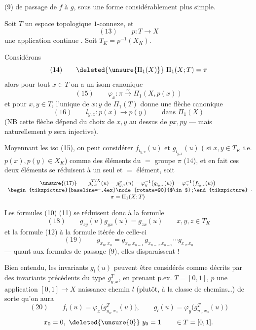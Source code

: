(9) de passage de $f$ à $g$, sous une forme considérablement plus simple.

Soit $T$ un espace topologique  $1$-connexe, et
\[
(13)\qquad p:T\longrightarrow X
\]
une application continue . Soit $T_K=p^{-1}(X_K)$.

Considérons 
\[
(14)\qquad\deleted{\unsure{\Pi_1(X)}}\ \Pi_1(X;T)=\pi
\]
alors pour tout $x\in T$ on a un isom canonique
\[
(15)\qquad\varphi_x:\pi\xrightarrow{\sim}\Pi_1(X,p(x))
\]
et pour $x,y\in T$, l'unique   de  $x:y$ de $\Pi_1(T)$ donne  une flèche canonique
\[
(16)\qquad l_{y,x}:p(x)\longrightarrow p(y)\qquad\text{dans }\Pi_1(X)
\]
(NB cette flèche dépend du choix de $x,y$ au dessus de $px,py$ --- mais naturellement $p$ sera injective).

Moyennant les iso (15), on peut considérer $f_{l_{y,x}}(u)$ et $g_{l_{y,x}}(u)$ ( si $x,y\in T_K$ i.e. $p(x),p(y)\in X_K$) comme des éléments du $=$ groupe $\pi$ (14),  et en fait ces deux éléments se réduisent à un seul et $=$ élément, soit
\[
\begin{array}{c}
\unsure{(17)}\qquad g_{y,x}^{T/X}(u)=g_{y,x}^{p}(u)=\varphi_y^{-1}\bigl(g_{l_{y,x}}(u)\bigr)=\varphi_x^{-1}\bigl(f_{l_{y,x}}(u)\bigr)\\
\begin{tikzpicture}[baseline=-.4ex]\node[rotate=90]{$\in$};\end{tikzpicture}\\
\pi=\Pi_1(X;T)
\end{array}.
\]

Les formules (10) (11) se réduisent donc à la formule
\[
(18)\qquad g_{zy}(u)g_{yx}(u)=g_{zx}(u)\qquad x,y,z\in T_K
\]
et la formule (12) à la formule itérée de celle-ci
\[
(19)\qquad g_{x_n,x_0}=g_{x_n,x_{n-1}}\,g_{x_{n-1},x_{n-2}}\cdots g_{x_1,x_0}
\]
--- quant aux formules de passage (9), elles  disparaissent !

Bien entendu, les invariants $g_l(u)$  peuvent être considérés comme décrits par des invariants précédents du type $g_{y,x}^T$, en prenant  p.ex. $T=[0,1]$, $p$ une application $[0,1]\longrightarrow X$  naissance  chemin $l$ (plutôt, à la classe de chemins\ldots) de sorte qu'on aura
\[
(20)\qquad f_l(u)=\varphi_x\bigl(g_{y_0,x_0}^T(u)\bigr),\qquad g_l(u)=\varphi_y\bigl(g_{y_0,x_0}^T(u)\bigr)
\]
\[
x_0=0,\ \deleted{\unsure{0}}\ y_0=1\qquad\in T=[0,1].
\]

